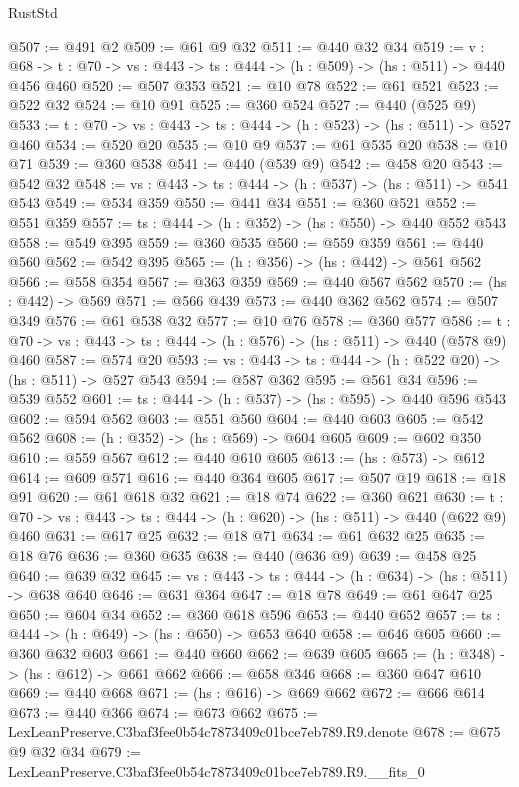 \begin{lexlean}{RustStd}
\begin{coremodule}
@507 := @491 @2
@509 := @61 @9 @32
@511 := @440 @32 @34
@519 := {v : @68} ->
  {t : @70} -> {vs : @443} -> {ts : @444} -> (h : @509) -> (hs : @511) -> @440 @456 @460
@520 := @507 @353
@521 := @10 @78
@522 := @61 @521
@523 := @522 @32
@524 := @10 @91
@525 := @360 @524
@527 := @440 (@525 @9)
@533 := {t : @70} -> {vs : @443} -> {ts : @444} -> (h : @523) -> (hs : @511) -> @527 @460
@534 := @520 @20
@535 := @10 @9
@537 := @61 @535 @20
@538 := @10 @71
@539 := @360 @538
@541 := @440 (@539 @9)
@542 := @458 @20
@543 := @542 @32
@548 := {vs : @443} -> {ts : @444} -> (h : @537) -> (hs : @511) -> @541 @543
@549 := @534 @359
@550 := @441 @34
@551 := @360 @521
@552 := @551 @359
@557 := {ts : @444} -> (h : @352) -> (hs : @550) -> @440 @552 @543
@558 := @549 @395
@559 := @360 @535
@560 := @559 @359
@561 := @440 @560
@562 := @542 @395
@565 := (h : @356) -> (hs : @442) -> @561 @562
@566 := @558 @354
@567 := @363 @359
@569 := @440 @567 @562
@570 := (hs : @442) -> @569
@571 := @566 @439
@573 := @440 @362 @562
@574 := @507 @349
@576 := @61 @538 @32
@577 := @10 @76
@578 := @360 @577
@586 := {t : @70} -> {vs : @443} -> {ts : @444} -> (h : @576) -> (hs : @511) -> @440 (@578 @9) @460
@587 := @574 @20
@593 := {vs : @443} -> {ts : @444} -> (h : @522 @20) -> (hs : @511) -> @527 @543
@594 := @587 @362
@595 := @561 @34
@596 := @539 @552
@601 := {ts : @444} -> (h : @537) -> (hs : @595) -> @440 @596 @543
@602 := @594 @562
@603 := @551 @560
@604 := @440 @603
@605 := @542 @562
@608 := (h : @352) -> (hs : @569) -> @604 @605
@609 := @602 @350
@610 := @559 @567
@612 := @440 @610 @605
@613 := (hs : @573) -> @612
@614 := @609 @571
@616 := @440 @364 @605
@617 := @507 @19
@618 := @18 @91
@620 := @61 @618 @32
@621 := @18 @74
@622 := @360 @621
@630 := {t : @70} -> {vs : @443} -> {ts : @444} -> (h : @620) -> (hs : @511) -> @440 (@622 @9) @460
@631 := @617 @25
@632 := @18 @71
@634 := @61 @632 @25
@635 := @18 @76
@636 := @360 @635
@638 := @440 (@636 @9)
@639 := @458 @25
@640 := @639 @32
@645 := {vs : @443} -> {ts : @444} -> (h : @634) -> (hs : @511) -> @638 @640
@646 := @631 @364
@647 := @18 @78
@649 := @61 @647 @25
@650 := @604 @34
@652 := @360 @618 @596
@653 := @440 @652
@657 := {ts : @444} -> (h : @649) -> (hs : @650) -> @653 @640
@658 := @646 @605
@660 := @360 @632 @603
@661 := @440 @660
@662 := @639 @605
@665 := (h : @348) -> (hs : @612) -> @661 @662
@666 := @658 @346
@668 := @360 @647 @610
@669 := @440 @668
@671 := (hs : @616) -> @669 @662
@672 := @666 @614
@673 := @440 @366
@674 := @673 @662
@675 := LexLeanPreserve.C3baf3fee0b54c7873409c01bce7eb789.R9.denote
@678 := @675 @9 @32 @34
@679 := LexLeanPreserve.C3baf3fee0b54c7873409c01bce7eb789.R9.__fits_0

\end{coremodule}
\end{lexlean}
